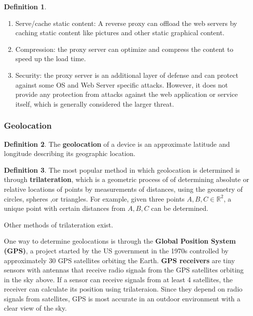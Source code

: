 \documentclass[a4paper, 12pt]{report}
\theoremstyle{remark}
\theoremstyle{definition}
\newtheorem{definition}{Definition}[section]
\begin{document}
\begin{definition}
\begin{enumerate}
\begin{enumerate}
        \item Serve/cache static content: A reverse proxy can offload the web servers by caching static content like pictures and other static graphical content.
        \item Compression: the proxy server can optimize and compress the content to speed up the load time.
        \item Security: the proxy server is an additional layer of defense and can protect against some OS and Web Server specific attacks. However, it does not provide any protection from attacks against the web application or service itself, which is generally considered the larger threat.
    \end{enumerate}
\end{enumerate}
\end{definition}

\subsubsection{Geolocation}

\begin{definition}
The \textbf{geolocation} of a device is an approximate latitude and longitude describing its geographic location. 
\end{definition}

\begin{definition}
The most popular method in which geolocation is determined is through \textbf{trilateration}, which is a geometric process of of determining absolute or relative locations of points by measurements of distances, using the geometry of circles, spheres ,or triangles. For example, given three points $A, B, C \in \mathbb{R}^2$, a unique point with certain distances from $A, B, C$ can be determined. 
\begin{center}
\end{center}
Other methods of trilateration exist. 
\end{definition}

One way to determine geolocations is through the \textbf{Global Position System (GPS)}, a project started by the US government in the 1970s controlled by approximately 30 GPS satellites orbiting the Earth. \textbf{GPS receivers} are tiny sensors with antennas that receive radio signals from the GPS satellites orbiting in the sky above. If a sensor can receive signals from at least 4 satellites, the receiver can calculate its position using trilateraion. Since they depend on radio signals from satellites, GPS is most accurate in an outdoor environment with a clear view of the sky. 
\end{document}

